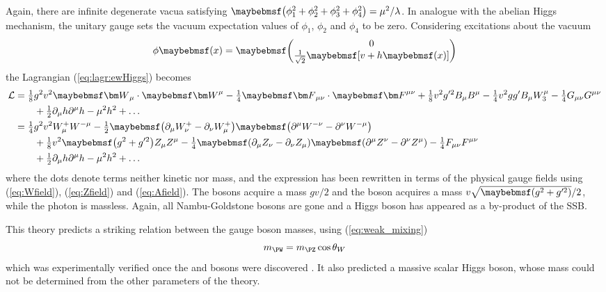 Again, there are infinite degenerate vacua satisfying 
$\parenths{\phi_1^2 + \phi_2^2 + \phi_3^2 + \phi_4^2} = \mu^2/\lambda$. In analogue with 
the abelian Higgs mechanism, the unitary gauge sets the vacuum expectation values of 
$\phi_1$, $\phi_2$ and $\phi_4$ to be zero. Considering excitations about the vacuum
\begin{equation}
	\phi\parenths{x} = \colvector{0\\ \frac{1}{\sqrt{2}} 
	\sqbracs{v + h\parenths{x}}} \label{eq:higgs_doublet}
\end{equation}
the Lagrangian (\ref{eq:lagr:ewHiggs}) becomes
\begin{align}
	\mathcal{L} &= \tfrac{1}{8} g^2 v^2 \bvec{W}_{\mu} \cdot \bvec{W}^{\mu} - \tfrac{1}{4} \bvec{F}_{\mu\nu} \cdot \bvec{F}^{\mu\nu} + \tfrac{1}{8} v^2 g'^2 B_{\mu} B^{\mu} - \tfrac{1}{4} v^2 gg' B_{\mu} W_{3}^{\mu} - \tfrac{1}{4} G_{\mu\nu} G^{\mu\nu} \nonumber \\
	&\quad\quad {} + \tfrac{1}{2} \partial_{\mu}h \partial^{\mu}h - \mu^2 h^2 + \dots \\
	&= \tfrac{1}{4} g^2 v^2 W^{+}_{\mu} W^{-\mu} - \tfrac{1}{2} \parenths{\partial_{\mu}W^{+}_{\nu} - \partial_{\nu}W^{+}_{\mu}} \parenths{\partial^{\mu}W^{-\nu} - \partial^{\nu}W^{-\mu}} \nonumber \\
	&\quad\quad {} + \tfrac{1}{8} v^2 \parenths{g^2 + g'^2} Z_{\mu} Z^{\mu} - \tfrac{1}{4} \parenths{\partial_{\mu}Z_{\nu} - \partial_{\nu}Z_{\mu}} \parenths{\partial^{\mu}Z^{\nu} - \partial^{\nu}Z^{\mu}} - \tfrac{1}{4} F_{\mu\nu} F^{\mu\nu} \nonumber \\
	&\quad\quad {} + \tfrac{1}{2} \partial_{\mu}h \partial^{\mu}h - \mu^2 h^2 + \dots
\end{align}
where the dots denote terms neither kinetic nor mass, and the expression has been rewritten in terms of the physical gauge fields using (\ref{eq:Wfield}), (\ref{eq:Zfield})
and (\ref{eq:Afield}). The \PWpm bosons acquire a mass $gv/2$ and the \PZ boson acquires a
mass $v \sqrt{\parenths{g^2+g'^2}}/2$, while the photon is massless. Again, all Nambu-Goldstone bosons are gone and a Higgs boson has appeared as a by-product of the \ac{SSB}.

This theory predicts a striking relation between the gauge boson masses, using 
(\ref{eq:weak_mixing})
\begin{equation}
	m_{\PW} = m_{\PZ} \cos\theta_W
\end{equation}
which was experimentally verified once the \PW and \PZ bosons were discovered 
\cite{UA1:1989}. It also predicted a massive scalar Higgs boson, whose mass could not be 
determined from the other parameters of the theory.

